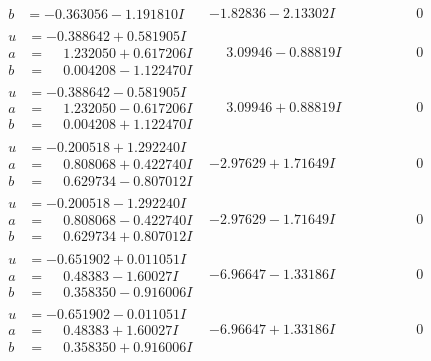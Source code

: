 \documentclass[1p]{elsarticle_modified}
\theoremstyle{definition}
\begin{document}
$$\begin{array}{c|c|c}
\begin{aligned}
b &= -0.363056 - 1.191810 I\end{aligned}
 & -1.82836 - 2.13302 I & \phantom{-0.000000 } 0 \\ \hline\begin{aligned}
u &= -0.388642 + 0.581905 I \\
a &= \phantom{-}1.232050 + 0.617206 I \\
b &= \phantom{-}0.004208 - 1.122470 I\end{aligned}
 & \phantom{-}3.09946 - 0.88819 I & \phantom{-0.000000 } 0 \\ \hline\begin{aligned}
u &= -0.388642 - 0.581905 I \\
a &= \phantom{-}1.232050 - 0.617206 I \\
b &= \phantom{-}0.004208 + 1.122470 I\end{aligned}
 & \phantom{-}3.09946 + 0.88819 I & \phantom{-0.000000 } 0 \\ \hline\begin{aligned}
u &= -0.200518 + 1.292240 I \\
a &= \phantom{-}0.808068 + 0.422740 I \\
b &= \phantom{-}0.629734 - 0.807012 I\end{aligned}
 & -2.97629 + 1.71649 I & \phantom{-0.000000 } 0 \\ \hline\begin{aligned}
u &= -0.200518 - 1.292240 I \\
a &= \phantom{-}0.808068 - 0.422740 I \\
b &= \phantom{-}0.629734 + 0.807012 I\end{aligned}
 & -2.97629 - 1.71649 I & \phantom{-0.000000 } 0 \\ \hline\begin{aligned}
u &= -0.651902 + 0.011051 I \\
a &= \phantom{-}0.48383 - 1.60027 I \\
b &= \phantom{-}0.358350 - 0.916006 I\end{aligned}
 & -6.96647 - 1.33186 I & \phantom{-0.000000 } 0 \\ \hline\begin{aligned}
u &= -0.651902 - 0.011051 I \\
a &= \phantom{-}0.48383 + 1.60027 I \\
b &= \phantom{-}0.358350 + 0.916006 I\end{aligned}
 & -6.96647 + 1.33186 I & \phantom{-0.000000 } 0 \\ \hline\begin{aligned}

\end{aligned}
\end{array}$$
\end{document}
